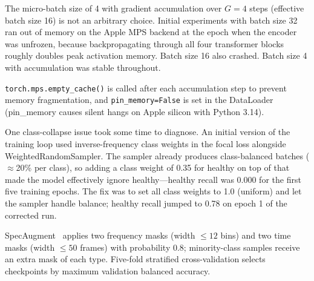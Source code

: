 \documentclass[10pt,journal,compsoc]{IEEEtran}
\begin{document}
The micro-batch size of 4 with gradient accumulation over $G=4$ steps
(effective batch size 16) is not an arbitrary choice. Initial experiments
with batch size 32 ran out of memory on the Apple MPS backend at the epoch
when the encoder was unfrozen, because backpropagating through all four
transformer blocks roughly doubles peak activation memory. Batch size 16
also crashed. Batch size 4 with accumulation was stable throughout.

\texttt{torch.mps.empty\_cache()} is called after each accumulation step to
prevent memory fragmentation, and \texttt{pin\_memory=False} is set in the
DataLoader (pin\_memory causes silent hangs on Apple silicon with Python 3.14).

One class-collapse issue took some time to diagnose. An initial version of the
training loop used inverse-frequency class weights in the focal loss alongside
WeightedRandomSampler. The sampler already produces class-balanced batches
($\approx$20\% per class), so adding a class weight of 0.35 for healthy on
top of that made the model effectively ignore healthy---healthy recall was 0.000
for the first five training epochs. The fix was to set all class weights to 1.0
(uniform) and let the sampler handle balance; healthy recall jumped to 0.78
on epoch 1 of the corrected run.

SpecAugment~\cite{specaugment} applies two frequency masks (width $\leq\!12$
bins) and two time masks (width $\leq\!50$ frames) with probability 0.8;
minority-class samples receive an extra mask of each type.
Five-fold stratified cross-validation selects checkpoints by maximum
validation balanced accuracy.
\end{document}
